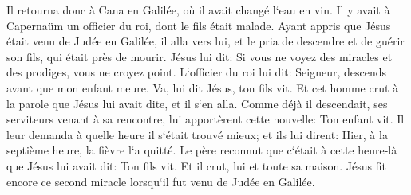 \verse Il retourna donc à Cana en Galilée, où il avait changé l`eau en vin. Il y avait à Capernaüm un officier du roi, dont le fils était malade. 
\verse Ayant appris que Jésus était venu de Judée en Galilée, il alla vers lui, et le pria de descendre et de guérir son fils, qui était près de mourir. 
\verse Jésus lui dit: Si vous ne voyez des miracles et des prodiges, vous ne croyez point. 
\verse L`officier du roi lui dit: Seigneur, descends avant que mon enfant meure. 
\verse Va, lui dit Jésus, ton fils vit. Et cet homme crut à la parole que Jésus lui avait dite, et il s`en alla. 
\verse Comme déjà il descendait, ses serviteurs venant à sa rencontre, lui apportèrent cette nouvelle: Ton enfant vit. 
\verse Il leur demanda à quelle heure il s`était trouvé mieux; et ils lui dirent: Hier, à la septième heure, la fièvre l`a quitté. 
\verse Le père reconnut que c`était à cette heure-là que Jésus lui avait dit: Ton fils vit. Et il crut, lui et toute sa maison. 
\verse Jésus fit encore ce second miracle lorsqu`il fut venu de Judée en Galilée. 

